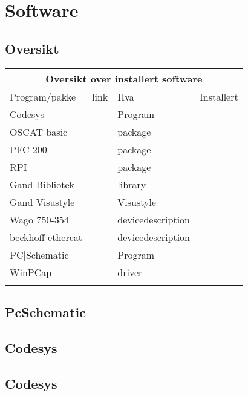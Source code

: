 
\section{Software}
\subsection{Oversikt}

\small
\begin{tabular}{|l|l|l|l|}
\hline 
\multicolumn{4}{|c|}{Oversikt over installert software}\tabularnewline
\hline 
\hline 
	Program/pakke & link & Hva & Installert\tabularnewline
\hline 
Codesys& &Program &\tabularnewline
\hline 
OSCAT basic& &package &\tabularnewline
\hline 
PFC 200& &package &\tabularnewline
\hline 
RPI& &package &\tabularnewline
\hline 
Gand Bibliotek& &library &\tabularnewline
\hline 
Gand Visustyle& &Visustyle &\tabularnewline
\hline 
Wago 750-354& &devicedescription &\tabularnewline
\hline 
beckhoff ethercat& &devicedescription &\tabularnewline
\hline 
PC|Schematic& &Program &\tabularnewline
\hline 
WinPCap& &driver &\tabularnewline
\hline 
& & &\tabularnewline
\hline 
\end{tabular}
\normalsize
\vfil \eject

\subsection{PcSchematic}
\subsection{Codesys}
\subsection{Codesys}





